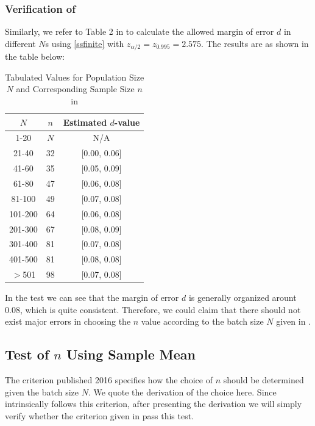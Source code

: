 \documentclass[12pt]{article}
\begin{document}
\subsubsection{Verification of \cite{OIML2016}}

Similarly, we refer to Table 2 in \cite{OIML2016} to calculate the allowed margin of error $d$ in different $N$s using \eqref{ssfinite} with $z_{\alpha/2} = z_{0.995} = 2.575$. The results are as shown in the table below:

\begin{table}[htbp]
    \centering
    \begin{tabular}{ccc}
        \toprule
        $N$ & $n$ & Estimated $d$-value \\
        \midrule
        1-20 & $N$ & N/A \\
        21-40 & 32 & [0.00, 0.06] \\
        41-60 & 35 & [0.05, 0.09] \\
        61-80 & 47 & [0.06, 0.08]\\ 
        81-100 & 49 & [0.07, 0.08]\\ 
        101-200 & 64 & [0.06, 0.08]\\ 
        201-300 & 67 & [0.08, 0.09]\\ 
        301-400 & 81 & [0.07, 0.08]\\ 
        401-500 & 81 & [0.08, 0.08]\\ 
        $>$501 & 98 & [0.07, 0.08] \\
        \bottomrule
    \end{tabular}
    \caption{Tabulated Values for Population Size $N$ and Corresponding Sample Size $n$ in \cite{OIML2016}}
\end{table}

In the test we can see that the margin of error $d$ is generally organized arount 0.08, which is quite consistent. Therefore, we could claim that there should not exist major errors in choosing the $n$ value according to the batch size $N$ given in \cite{OIML2016}. 

\subsection{Test of $n$ Using Sample Mean}

The criterion published 2016 \cite{OIML2016} specifies how the choice of $n$ should be determined given the batch size $N$. We quote the derivation of the choice here. Since \cite{OIML2016} intrinsically follows this criterion, after presenting the derivation we will simply verify whether the criterion given in \cite{JJF2005} pass this test. 
\end{document}
